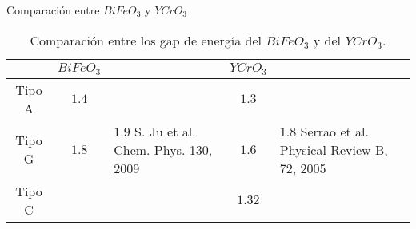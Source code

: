 \begin{frame}{Comparaci\'on entre $BiFeO_{3}$ y $YCrO_{3}$}
    \begin{table}[H]
        \begin{center}
            \caption{Comparaci\'on entre los gap de energ\'ia del $BiFeO_{3}$ y del $YCrO_{3}$.}
            \begin{tabular}{ccp{2cm}cp{2cm}}
                \hline
                & $BiFeO_{3}$&  & $YCrO_{3}$ &  \\
                \hline \hline
                Tipo A & $1.4$&  & $1.3$ &   \\
                \hline
                Tipo G & $1.8$& $1.9$ S. Ju et al. Chem. Phys. 130, 2009 & $1.6$ & $1.8$ Serrao et al. Physical Review B, 72, 2005 \\
                \hline
                Tipo C &  &  & $1.32$ &  \\
                \hline
            \end{tabular}
        \end{center}
    \end{table}
\end{frame}